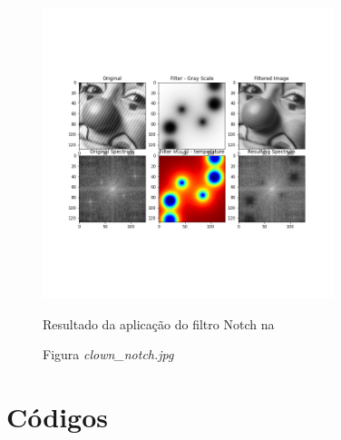 \documentclass{article}
\begin{document}
\begin{figure}[H]
	\label{fig:img_clown}
	\begin{minipage}[b]{1.0\linewidth}
		\centering
		\centerline{\includegraphics[width=8.5cm]{Figures/filtered_clown}}
		\vspace{-2.0cm}
		\centerline{Resultado da aplicação do filtro Notch na}
		\centerline{Figura \textit{clown\_notch.jpg}}\medskip	
	\end{minipage}
\end{figure}




\newpage
\onecolumn
\section{Códigos}
\end{document}
